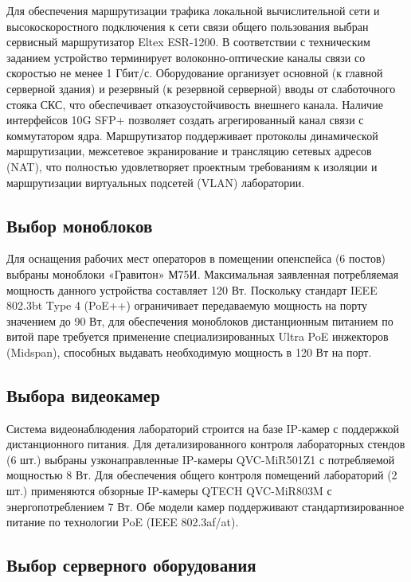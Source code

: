 \documentclass[a4paper,oneside,14pt]{extreport}
\begin{document}
Для обеспечения маршрутизации трафика локальной вычислительной сети и высокоскоростного подключения к сети связи общего пользования выбран сервисный маршрутизатор Eltex ESR-1200. В соответствии с техническим заданием устройство терминирует волоконно-оптические каналы связи со скоростью не менее 1 Гбит/с. Оборудование организует основной (к главной серверной здания) и резервный (к резервной серверной) вводы от слаботочного стояка СКС, что обеспечивает отказоустойчивость внешнего канала. Наличие интерфейсов 10G SFP+ позволяет создать агрегированный канал связи с коммутатором ядра. Маршрутизатор поддерживает протоколы динамической маршрутизации, межсетевое экранирование и трансляцию сетевых адресов (NAT), что полностью удовлетворяет проектным требованиям к изоляции и маршрутизации виртуальных подсетей (VLAN) лаборатории. 

\subsection{Выбор моноблоков}

Для оснащения рабочих мест операторов в помещении опенспейса (6 постов) выбраны моноблоки «Гравитон» М75И. Максимальная заявленная потребляемая мощность данного устройства составляет 120 Вт. Поскольку стандарт IEEE 802.3bt Type 4 (PoE++) ограничивает передаваемую мощность на порту значением до 90 Вт, для обеспечения моноблоков дистанционным питанием по витой паре требуется применение специализированных Ultra PoE инжекторов (Midspan), способных выдавать необходимую мощность в 120 Вт на порт.


\subsection{Выбора видеокамер}

Система видеонаблюдения лабораторий строится на базе IP-камер с поддержкой дистанционного питания. Для детализированного контроля лабораторных стендов (6 шт.) выбраны узконаправленные IP-камеры QVC-MiR501Z1 с потребляемой мощностью 8 Вт. Для обеспечения общего контроля помещений лабораторий (2 шт.) применяются обзорные IP-камеры QTECH QVC-MiR803M с энергопотреблением 7 Вт. Обе модели камер поддерживают стандартизированное питание по технологии PoE (IEEE 802.3af/at). 



\subsection{Выбор серверного оборудования}
\end{document}
